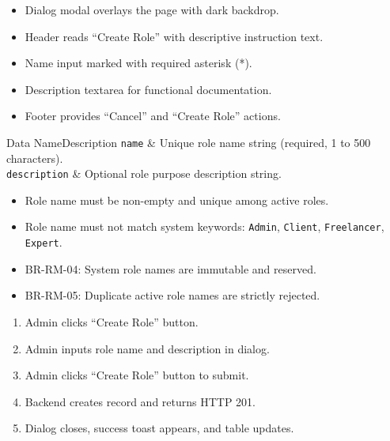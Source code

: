 \begin{itemize}[leftmargin=1.6em,topsep=3pt,itemsep=2pt,parsep=0pt,label=$\bullet$]
    \item Dialog modal overlays the page with dark backdrop.
    \item Header reads ``Create Role'' with descriptive instruction text.
    \item Name input marked with required asterisk (*).
    \item Description textarea for functional documentation.
    \item Footer provides ``Cancel'' and ``Create Role'' actions.
\end{itemize}


\begin{specdatatable}{Data Name}{Description}
\texttt{name} & Unique role name string (required, 1 to 500 characters).\\ \hline
\texttt{description} & Optional role purpose description string.\\ \hline
\end{specdatatable}

\begin{itemize}[leftmargin=1.6em,topsep=3pt,itemsep=2pt,parsep=0pt,label=$\bullet$]
    \item Role name must be non-empty and unique among active roles.
    \item Role name must not match system keywords: \texttt{Admin}, \texttt{Client}, \texttt{Freelancer}, \texttt{Expert}.
\end{itemize}

\begin{itemize}[leftmargin=1.6em,topsep=3pt,itemsep=2pt,parsep=0pt,label=$\bullet$]\brrulelist
    \item BR-RM-04: System role names are immutable and reserved.
    \item BR-RM-05: Duplicate active role names are strictly rejected.
\end{itemize}

\begin{enumerate}[leftmargin=1.8em,topsep=3pt,itemsep=2pt,parsep=0pt]
    \item Admin clicks ``Create Role'' button.
    \item Admin inputs role name and description in dialog.
    \item Admin clicks ``Create Role'' button to submit.
    \item Backend creates record and returns HTTP 201.
    \item Dialog closes, success toast appears, and table updates.
\end{enumerate}

